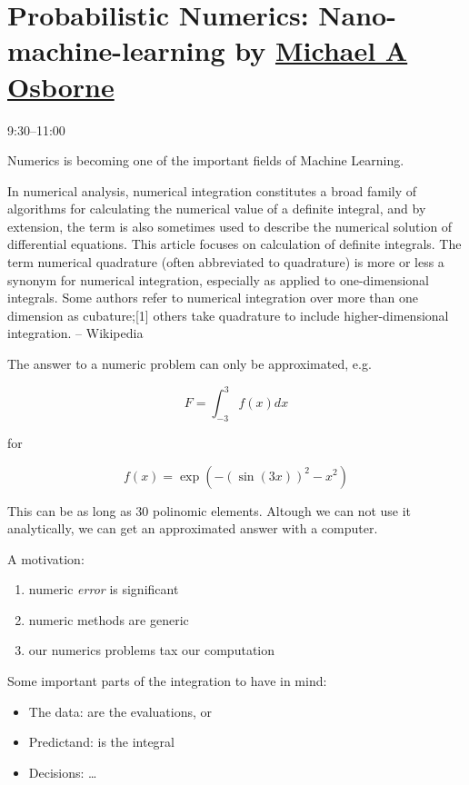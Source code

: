 \chapter{Probabilistic Numerics: Nano-machine-learning by
\href{http://www.robots.ox.ac.uk/\~mosb/}{Michael A Osborne}}

9:30--11:00

Numerics is becoming one of the important fields of Machine Learning.

\begin{mybox}
  In numerical analysis, numerical integration constitutes a broad family of
  algorithms for calculating the numerical value of a definite integral, and by
  extension, the term is also sometimes used to describe the numerical solution
  of differential equations. This article focuses on calculation of definite
  integrals. The term numerical quadrature (often abbreviated to quadrature) is
  more or less a synonym for numerical integration, especially as applied to
  one-dimensional integrals. Some authors refer to numerical integration over
  more than one dimension as cubature;[1] others take quadrature to include
  higher-dimensional integration. -- Wikipedia
\end{mybox}

The answer to a numeric problem can only be approximated, e.g.

\begin{equation}
  F = \int_{-3}^3 f(x) dx
\end{equation}

for

\begin{equation}
  f(x) = \exp(-(\sin(3x))^2 - x^2)
\end{equation}

This can be as long as 30 polinomic elements. Altough we can not use it
analytically, we can get an approximated answer with a computer.

A motivation:

\begin{enumerate}
  \item numeric \emph{error} is significant
  \item numeric methods are generic
  \item our numerics problems tax our computation
\end{enumerate}

Some important parts of the integration to have in mind:

\begin{itemize}
  \item The data: are the evaluations, or
  \item Predictand: is the integral
  \item Decisions: \dots
\end{itemize}

